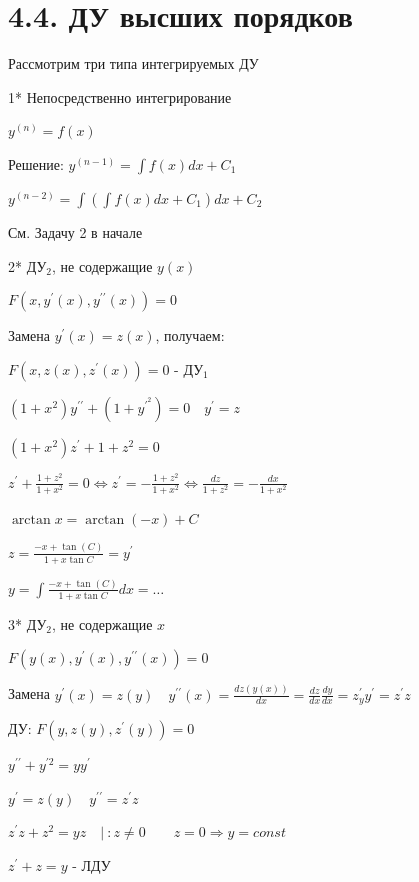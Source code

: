 \documentclass[12pt]{article}
\begin{document}
    \section{4.4. ДУ высших порядков}

    \Nota Рассмотрим три типа интегрируемых ДУ

    1* Непосредственно интегрирование

    $y^{(n)} = f(x)$

    Решение: $y^{(n - 1)} = \int f(x) dx + C_1$

    $y^{(n - 2)} = \int (\int f(x) dx + C_1) dx + C_2$

    \Ex См. Задачу 2 в начале

    2* ДУ$_2$, не содержащие $y(x)$

    $F(x, y^\prime(x), y^{\prime\prime}(x)) = 0$

    Замена $y^\prime(x) = z(x)$, получаем:

    $F(x, z(x), z^\prime(x)) = 0$ - ДУ$_1$

    \Ex $(1 + x^2)y^{\prime\prime} + (1 + y^\prime^2) = 0 \quad y^\prime = z$

    $(1 + x^2)z^\prime + 1 + z^2 = 0$

    $z^\prime + \frac{1 + z^2}{1 + x^2} = 0 \Longleftrightarrow z^\prime = -\frac{1 + z^2}{1 + x^2} \Longleftrightarrow \frac{dz}{1 + z^2} = -\frac{dx}{1 + x^2}$

    $\arctan x = \arctan(-x) + C$

    $z = \frac{-x + \tan(C)}{1 + x \tan C} = y^\prime$

    $y = \int \frac{-x + \tan(C)}{1 + x \tan C} dx = \dots $

    3* ДУ$_2$, не содержащие $x$

    $F(y(x), y^\prime(x), y^{\prime\prime}(x)) = 0$

    Замена $y^\prime(x) = z(y) \quad y^{\prime\prime}(x) = \frac{dz(y(x))}{dx} = \frac{dz}{dx} \frac{dy}{dx} = z^\prime_y y^\prime = z^\prime z$

    ДУ: $F(y, z(y), z^\prime(y)) = 0$

    \Ex $y^{\prime\prime} + y^{\prime 2} = yy^\prime$

    $y^\prime = z(y) \quad y^{\prime\prime} = z^\prime z$

    $z^\prime z + z^2 = yz \quad | \ : z \neq 0 \quad\quad z = 0 \Longrightarrow y = const$

    $z^\prime + z = y$ - ЛДУ
\end{document}
